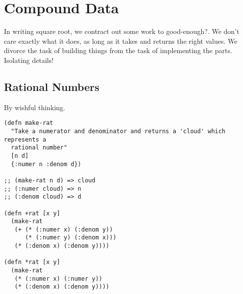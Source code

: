 \documentclass[11pt]{article}
\begin{document}
\section{Compound Data}
\label{sec-4}
In writing square root, we contract out some work to good-enough?. We don't care exactly what it does, as long as it takes and returns the right values. We divorce the task of building things from the task of implementing the parts. Isolating details!

\subsection{Rational Numbers}
\label{sec-4-1}
By wishful thinking.

\begin{verbatim}
(defn make-rat
  "Take a numerator and denominator and returns a 'cloud' which represents a
  rational number"
  [n d]
  {:numer n :denom d})

;; (make-rat n d) => cloud
;; (:numer cloud) => n
;; (:denom cloud) => d

(defn +rat [x y]
  (make-rat
   (+ (* (:numer x) (:denom y))
      (* (:numer y) (:denom x)))
   (* (:denom x) (:denom y))))

(defn *rat [x y]
  (make-rat
   (* (:numer x) (:numer y))
   (* (:denom x) (:denom y))))
\end{verbatim}
\end{document}
